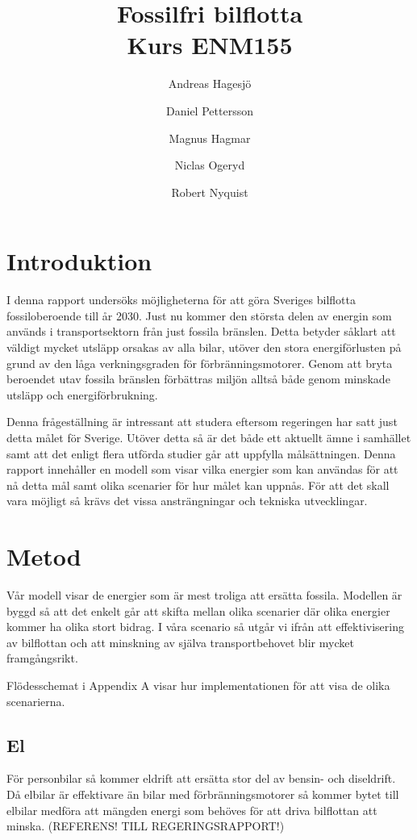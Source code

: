 \documentclass[a4paper,11pt,fleqn, titlepage]{article}
\author{Andreas Hagesjö \and Daniel Pettersson \and
Magnus Hagmar \and Niclas Ogeryd \and Robert Nyquist}
\title{Fossilfri bilflotta \\ Kurs ENM155}
\begin{document}
\maketitle

\section{Introduktion}
I denna rapport undersöks möjligheterna för att göra Sveriges bilflotta fossiloberoende till år 2030. Just nu kommer den största delen av energin som används i transportsektorn från just fossila bränslen. Detta betyder såklart att väldigt mycket utsläpp orsakas av alla bilar, utöver den stora energiförlusten på grund av den låga verkningsgraden för förbränningsmotorer. Genom att bryta beroendet utav fossila bränslen förbättras miljön alltså både genom minskade utsläpp och energiförbrukning.

Denna frågeställning är intressant att studera eftersom regeringen har satt just detta målet för Sverige. Utöver detta så är det både ett aktuellt ämne i samhället samt att det enligt flera utförda studier går att uppfylla målsättningen. Denna rapport innehåller en modell som visar vilka energier som kan användas för att nå detta mål samt olika scenarier för hur målet kan uppnås. För att det skall vara möjligt så krävs det vissa ansträngningar och tekniska utvecklingar. 

\section{Metod}

Vår modell visar de energier som är mest troliga att ersätta fossila. Modellen är byggd så att det enkelt går att skifta mellan olika scenarier där olika energier kommer ha olika stort bidrag.
I våra scenario så utgår vi ifrån att effektivisering av bilflottan och att minskning av själva transportbehovet blir mycket framgångsrikt.


Flödesschemat i Appendix A visar hur implementationen för att visa de olika scenarierna.

\subsection{El}

För personbilar så kommer eldrift att ersätta stor del av bensin- och diseldrift.  Då elbilar är effektivare än bilar med förbränningsmotorer så kommer bytet till elbilar medföra att mängden energi som behöves för att driva bilflottan att minska. (REFERENS! TILL REGERINGSRAPPORT!)
\end{document}
